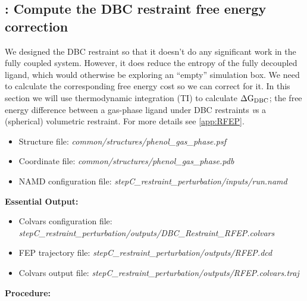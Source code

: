 \documentclass[9pt,tutorial]{Styling/livecoms}
\newcommand{\filepath}[1]{\textit{#1}}
\begin{document}
\subsection{\hspace{-1em}: Compute the DBC restraint free energy correction}
\label{step:restraintPerturbation}
    \begin{tcolorbox}[colback=blue!5!white,colframe=blue!75!black]
    We designed the DBC restraint so that it doesn't do any significant work in the fully coupled system. However, it does reduce the entropy of the fully decoupled ligand, which would otherwise be exploring an ``empty'' simulation box. We need to calculate the corresponding free energy cost so we can correct for it. In this section we will use thermodynamic integration (TI) to calculate $\Delta \rm G_\mathrm{DBC}$; the free energy difference between a gas-phase ligand under DBC restraints {\textit vs} a (spherical) volumetric restraint. For more details see \ref{app:RFEP}.
    \end{tcolorbox}

    \begin{itemize}
        \item Structure file: \filepath{common/structures/phenol\_gas\_phase.psf} 
        \item Coordinate file: \filepath{common/structures/phenol\_gas\_phase.pdb}
        \item NAMD configuration file: \filepath{stepC\_restraint\_perturbation/inputs/run.namd}
    \end{itemize}
    \textbf{Essential Output:}
    \begin{itemize}
        \item Colvars configuration file: \filepath{stepC\_restraint\_perturbation/outputs/DBC\_Restraint\_RFEP.colvars}
        \item FEP trajectory file: \filepath{stepC\_restraint\_perturbation/outputs/RFEP.dcd}
        \item Colvars output file: \filepath{stepC\_restraint\_perturbation/outputs/RFEP.colvars.traj}
    \end{itemize}
    \textbf{Procedure:}
\end{document}
